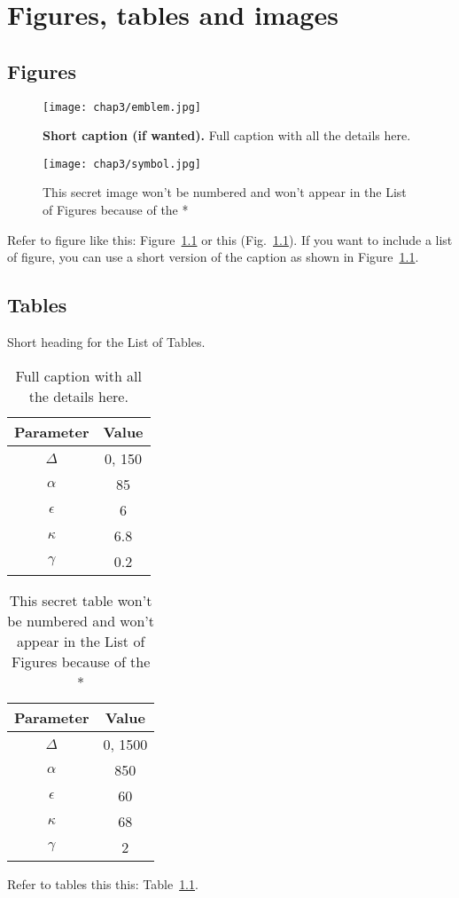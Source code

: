 

\chapter{Figures, tables and images} \label{chap-3}

\section{Figures}

\begin{figure}
\center
\texttt{[image: chap3/emblem.jpg]} 
\caption[Short caption for List of Figures]{{\bfseries Short caption (if wanted).} Full caption with all the details here.}
\label{fig-example}
\end{figure}

\begin{figure}
\center
\texttt{[image: chap3/symbol.jpg]} 
\caption*{This secret image won't be numbered and won't appear in the List of Figures because of the *}
\end{figure}

Refer to figure like this: Figure~\ref{fig-example} or this (Fig.~\ref{fig-example}). If you want to include a list of figure, you can use a short version of the caption as shown in Figure~\ref{fig-example}.


\section{Tables}

\begin{table} 
\center
\caption{Short heading for the List of Tables.}
\begin{tabular}{c|c}
Parameter & Value \\ \hline \hline
$\Delta$ & 0, 150 \\
${\alpha}$ & 85 \\
${\epsilon}$ & 6 \\
${\kappa}$ & 6.8 \\
${\gamma}$ & 0.2
\end{tabular}
\label{tab-values}
\caption*{Full caption with all the details here.}
\end{table}

\begin{table} \center
\begin{tabular}{c|c}
Parameter & Value \\ \hline \hline
$\Delta$ & 0, 1500 \\
${\alpha}$ & 850 \\
${\epsilon}$ & 60 \\
${\kappa}$ & 68 \\
${\gamma}$ & 2
\end{tabular}
\caption*{This secret table won't be numbered and won't appear in the List of Figures because of the * }
\end{table}


Refer to tables this this: Table~\ref{tab-values}.